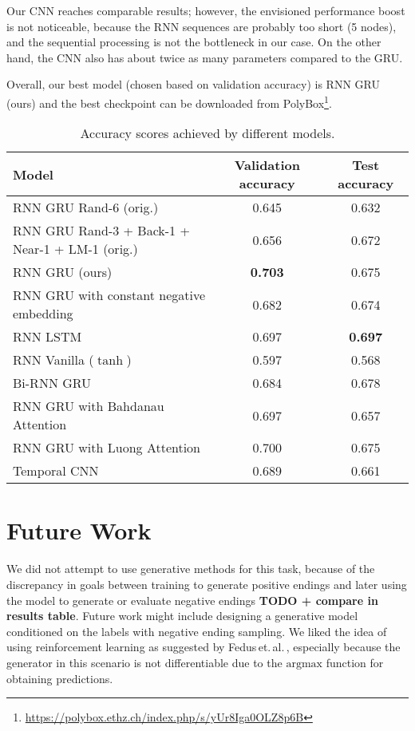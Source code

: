 \documentclass{article}
\begin{document}
Our CNN reaches comparable results; however, the envisioned performance boost is not noticeable, because the RNN sequences are probably too short (5 nodes), and the sequential processing is not the bottleneck in our case.
On the other hand, the CNN also has about twice as many parameters compared to the GRU.

Overall, our best model (chosen based on validation accuracy) is RNN GRU (ours) and the best checkpoint can be downloaded from PolyBox\footnote{\url{https://polybox.ethz.ch/index.php/s/yUr8Iga0OLZ8p6B}}.

\begin{table}[btp]\centering
\begin{tabular}{lcc}
\toprule
Model    	& Validation accuracy  	 		  & Test accuracy  					\\
\midrule
RNN GRU \citep{Roemmele2017AnTest} Rand-6 (orig.)    	& 0.645  	 		  & 0.632  \\
RNN GRU \citep{Roemmele2017AnTest} Rand-3 + Back-1
+ Near-1 + LM-1 (orig.)    	& 0.656  	 		  & 0.672  \\
\midrule

RNN GRU \citep{Roemmele2017AnTest} (ours)    	& \textbf{0.703}  	 		  & 0.675  \\
RNN GRU with constant negative embedding    	& 0.682  	 		  & 0.674 \\
RNN LSTM		& 0.697 		 	  & \textbf{0.697} \\
RNN Vanilla ($\tanh$)		& 0.597 		 	  & 0.568  \\
Bi-RNN GRU		& 0.684   			  & 0.678  \\
RNN GRU with Bahdanau \citep{Bahdanau2016End-to-EndRecognition} Attention     	& 0.697	 	 		  & 0.657  \\
RNN GRU with Luong \citep{Luong2015EffectiveTranslation} Attention    	& 0.700	 	 		  & 0.675  \\
\midrule
Temporal CNN   	& 0.689	 	 		  & 0.661\\\bottomrule
\end{tabular}
\caption{Accuracy scores achieved by different models.}\label{tab:results}
\end{table}

\section{Future Work}\label{sec:futurework}
We did not attempt to use generative methods for this task, because of the discrepancy in goals between training
to generate positive endings and later using the model to generate or evaluate negative endings \citep{TCGAN} \textbf{TODO + compare in results table}.
Future work might include designing a generative model conditioned on the labels with negative ending sampling.
We liked the idea of using reinforcement learning as suggested by Fedus\,et.\,al.\,\citep{Fedus2018MaskGAN:_______},
especially because the generator in this scenario is not differentiable due to the $\mathrm{argmax}$ function for obtaining predictions.
\end{document}
